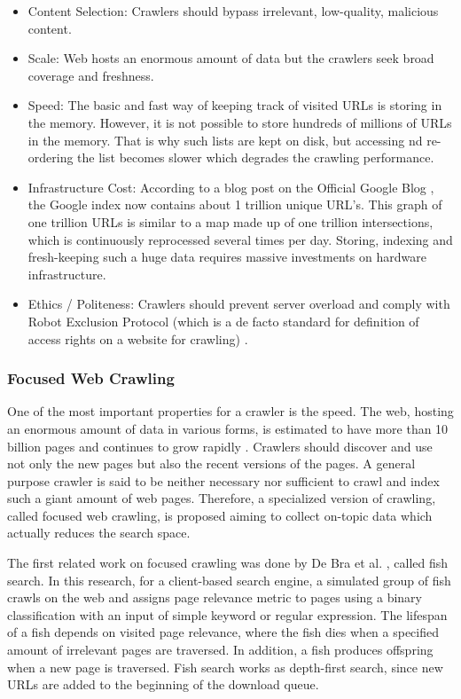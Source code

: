 	\begin{itemize}
		\item Content Selection: Crawlers should bypass irrelevant, low-quality, malicious content.
		\item Scale: Web hosts an enormous amount of data but the crawlers seek broad coverage and freshness.
		\item Speed: The basic and fast way of keeping track of visited URLs is storing in the memory. However, it is not possible to store hundreds of millions of URLs in the memory. That is why such lists are kept on disk, but accessing nd re-ordering the list becomes slower which degrades the crawling performance.
		\item Infrastructure Cost: According to a blog post on the Official Google Blog \cite{A2013}, the Google index now contains about 1 trillion unique URL's. This graph of one trillion URLs is similar to a map made up of one trillion intersections, which is continuously reprocessed several times per day. Storing, indexing and fresh-keeping such a huge data requires massive investments on hardware infrastructure.
		\item Ethics / Politeness: Crawlers should prevent server overload and comply with Robot Exclusion Protocol (which is a de facto standard for definition of access rights on a website for crawling) \cite{K2013}.
	\end{itemize}
	
	\subsubsection{Focused Web Crawling}\label{focusedWebCrawling}

	One of the most important properties for a crawler is the speed. The web, hosting an enormous amount of data in various forms, is estimated to have more than 10 billion pages and continues to grow rapidly \cite{WWW2013}. Crawlers should discover and use not only the new pages but also the recent versions of the pages. A general purpose crawler is said to be neither necessary nor sufficient to crawl and index such a giant amount of web pages. Therefore, a specialized version of crawling, called focused web crawling, is proposed aiming to collect on-topic data which actually reduces the search space.
	
	The first related work on focused crawling was done by De Bra et al. \cite[p. 481-493]{B1994}, called fish search. In this research, for a client-based search engine, a simulated group of fish crawls on the web and assigns page relevance metric to pages using a binary classification with an input of simple keyword or regular expression. The lifespan of a fish depends on visited page relevance, where the fish dies when a specified amount of irrelevant pages are traversed. In addition, a fish produces offspring when a new page is traversed. Fish search works as depth-first search, since new URLs are added to the beginning of the download queue.
	

